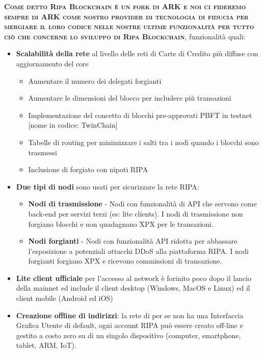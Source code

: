 \documentclass[11pt,fleqn,oneside]{book} %
\begin{document}
\vspace{5mm}
\textsc{\textbf{Come detto Ripa Blockchain è un fork di ARK e noi ci fideremo sempre di ARK come nostro provider di tecnologia 
di fiducia per mergiare il loro codice nelle nostre ultime funzionalità per tutto ciò che concerne lo sviluppo di 
Ripa Blockchain}}, funzionalità quali:
\begin{itemize}
	\item \textbf{Scalabilità della rete} al livello delle reti di Carte di Credito più diffuse con aggiornamento del core
	\begin{itemize}
		\item Aumentare il numero dei delegati forgianti
		\item Aumentare le dimensioni del blocco per includere più transazioni
		\item Implementazione del concetto di blocchi pre-approvati PBFT in testnet [nome in codice: TwinChain]
		\item Tabelle di routing per minimizzare i salti tra i nodi quando i blocchi sono trasmessi
		\item Inclusione di forgiato con nipoti RIPA
	\end{itemize}
	\item \textbf{Due tipi di nodi} sono usati per sicurizzare la rete RIPA:
	\begin{itemize}
		\item \textbf{Nodi di trasmissione} - Nodi con funzionalità di API che servono come back-end per servizi terzi
		(es: lite clients). I nodi di trasmissione non forgiano blocchi e non quadagnano XPX per le transazioni.
		\item \textbf{Nodi forgianti} - Nodi con funzionalità API ridotta per abbassare l'esposizione a potenziali
		attacchi DDoS alla piattaforma RIPA. I nodi forgianti forgiano XPX e ricevono commissioni di transazione.
	\end{itemize}
	\item \textbf{Lite client ufficiale} per l'accesso al network è forinito poco dopo il lancio della mainnet ed 
	include il client desktop (Windows, MacOS e Linux) ed il client mobile (Android ed iOS)
	\item \textbf{Creazione offline di indirizzi}: la rete di per se non ha una Interfaccia Grafica Utente di 
	default, ogni account RIPA può essere creato off-line e gestito a costo zero su di un singolo dispositivo
	(computer, smartphone, tablet, ARM, IoT).
\end{itemize}
\end{document}
